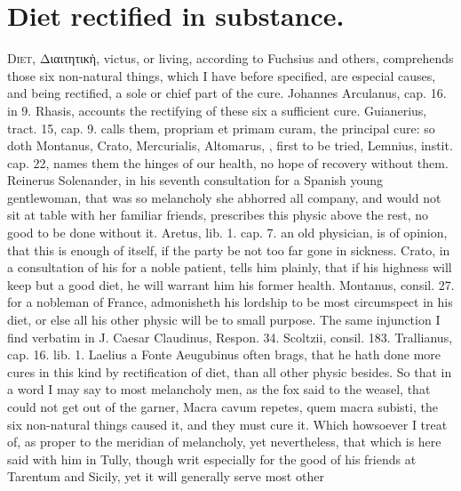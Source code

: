 {%
\section{Diet rectified in substance.}

\lettrine{D}{iet}, \textgreek[variant=ancient]{Διαιτητικὴ}, victus, or living, according to  Fuchsius and
others, comprehends those six non-natural things, which I have before
specified, are especial causes, and being rectified, a sole or chief
part of the cure. Johannes Arculanus, cap. 16. in 9. Rhasis,
accounts the rectifying of these six a sufficient cure. Guianerius,
tract. 15, cap. 9. calls them, propriam et primam curam, the principal
cure: so doth Montanus, Crato, Mercurialis, Altomarus, \etc{}, first to be
tried, Lemnius, instit. cap. 22, names them the hinges of our health,
no hope of recovery without them. Reinerus Solenander, in his
seventh consultation for a Spanish young gentlewoman, that was so
melancholy she abhorred all company, and would not sit at table with
her familiar friends, prescribes this physic above the rest, no
good to be done without it. Aretus, lib. 1. cap. 7. an old
physician, is of opinion, that this is enough of itself, if the party
be not too far gone in sickness. Crato, in a consultation of his
for a noble patient, tells him plainly, that if his highness will keep
but a good diet, he will warrant him his former health. Montanus,
consil. 27. for a nobleman of France, admonisheth his lordship to be
most circumspect in his diet, or else all his other physic will
be to small purpose. The same injunction I find verbatim in J.
Caesar Claudinus, Respon. 34. Scoltzii, consil. 183. Trallianus, cap.
16. lib. 1. Laelius a Fonte Aeugubinus often brags, that he hath done
more cures in this kind by rectification of diet, than all other physic
besides. So that in a word I may say to most melancholy men, as the fox
said to the weasel, that could not get out of the garner, Macra cavum
repetes, quem macra subisti, the six non-natural things caused
it, and they must cure it. Which howsoever I treat of, as proper to the
meridian of melancholy, yet nevertheless, that which is here said with
him in Tully, though writ especially for the good of his friends
at Tarentum and Sicily, yet it will generally serve most other
}
